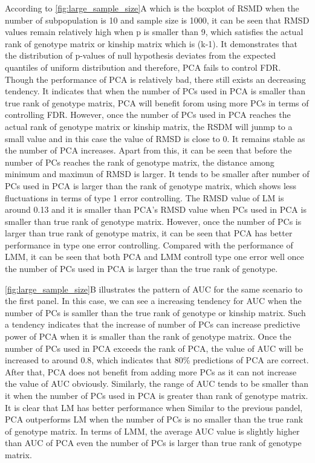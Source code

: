 \documentclass[12pt]{article}
\begin{document}
According to \cref{fig:large_sample_size}A which is the boxplot of RSMD when the number of subpopulation is 10 and sample size is 1000, it can be seen that RMSD values remain relatively high when p is smaller than 9, which satisfies the actual rank of genotype matrix or kinship matrix which is (k-1).
It demonstrates that the distribution of p-values of null hypothesis deviates from the expected quantiles of uniform distribution and therefore, PCA fails to control FDR.
Though the performance of PCA is relatively bad, there still exists an decreasing tendency.
It indicates that when the number of PCs used in PCA is smaller than true rank of genotype matrix, PCA will benefit forom using more PCs in terms of controlling FDR.
However, once the number of PCs used in PCA reaches the actual rank of genotype matrix or kinship matrix, the RSDM will junmp to a small value and in this case the value of RMSD is close to 0.
It remains stable as the number of PCA increases.
Apart from this, it can be seen that before the number of PCs reaches the rank of genotype matrix, the distance among minimum and maximun of RMSD is larger.
It tends to be smaller after number of PCs used in PCA is larger than the rank of genotype matrix, which shows less fluctuations in terms of type 1 error controlling.
The RMSD value of LM is around 0.13 and it is smaller than PCA's RMSD value when PCs used in PCA is smaller than true rank of genotype matrix.
However, once the number of PCs is larger than true rank of genotype matrix, it can be seen that PCA has better performance in type one error controlling.
Compared with the performance of LMM, it can be seen that both PCA and LMM controll type one error well once the number of PCs used in PCA is larger than the true rank of genotype.

\cref{fig:large_sample_size}B illustrates the pattern of AUC for the same scenario to the first panel.
In this case, we can see a increasing tendency for AUC when the number of PCs is samller than the true rank of genotype or kinship matrix.
Such a tendency indicates that the increase of number of PCs can increase predictive power of PCA when it is smaller than the rank of genotype matrix.
Once the number of PCs used in PCA exceeds the rank of PCA, the value of AUC will be increased to around 0.8, which indicates that $80\%$ predictions of PCA are correct.
After that, PCA does not benefit from adding more PCs as it can not increase the value of AUC obviously.
Similarly, the range of AUC tends to be smaller than it when the number of PCs used in PCA is greater than rank of genotype matrix.
It is clear that LM has better performance when
Similar to the previous pandel, PCA outperforms LM when the number of PCs is no smaller than the true rank of genotype matrix.
In terms of LMM, the average AUC value is slightly higher than AUC of PCA even the number of PCs is larger than true rank of genotype matrix. 
\end{document}
